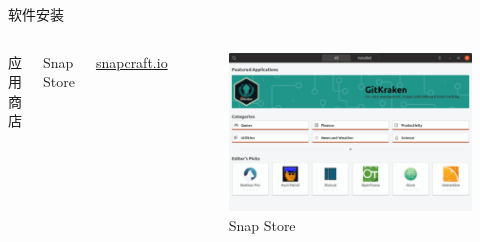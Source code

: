 \documentclass[UTF8]{ctexbeamer}
\begin{document}
\begin{frame}{软件安装}

    \begin{columns}
    
        
        应用商店
        
        Snap Store
        
        \href{https://snapcraft.io/store}{snapcraft.io}
        
        \begin{figure}
            \centering
            \includegraphics[width=\textwidth]{gnome-snap.png}
            \caption{Snap Store}
        \end{figure}
    \end{columns}
    
\end{frame}
\end{document}
